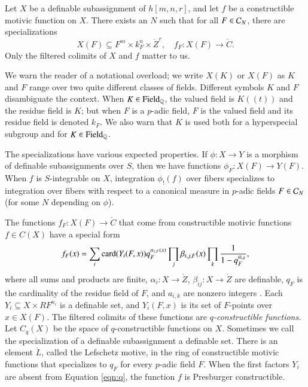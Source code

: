 Let $X$ be a definable subassignment of $h[m,n,r]$, and let $f$ be a
constructible motivic function on $X$.  There exists an $N$ such that
for all $F\in \mathcal C_N$, there are specializations
\[
X(F)\subseteq F^m\times k_F^n\times \ring{Z}^r,  
\quad f_F: X(F) \to\ring{C}.
\]
Only the  filtered colimits of $X$ and $f$ matter to us.

We warn the reader of a notational overload; we write $X(K)$ or $X(F)$
as $K$ and $F$ range over two quite different classes of fields.
Different symbols $K$ and $F$ disambiguate the context.  When $K\in
{\operatorname{Field}}_{\mathbb{Q}}$, the valued field is $K((t))$ and the residue field is
$K$; but when $F$ is a $p$-adic field, $F$ is the valued field and its
residue field is denoted $k_F$.  We also warn that $K$ is used both
for a hyperspecial subgroup and for $K\in{\operatorname{Field}}_{\mathbb{Q}}$.

The specializations have various expected properties.  If $\phi:X\to
Y$ is a morphism of definable subassignments over $S$, then we have
functions $\phi_F:X(F)\to Y(F)$.  When $f$ is $S$-integrable on $X$,
integration $\phi_!(f)$ over fibers specializes to integration over
fibers with respect to a canonical measure in $p$-adic fields $F\in
\mathcal C_N$ (for some $N$ depending on $\phi$).

The functions $f_F:X(F)\to\ring{C}$ that come from constructible
motivic functions $f\in C(X)$ have a special form
\begin{equation}\label{eqn:q}
f_F(x) = \sum_i {\operatorname{card}}(Y_i(F,x)) q_F^{\alpha_{i,F}(x)} 
\prod_j \beta_{i,j,F}(x)\prod_k \frac{1}{1-q_F^{a_{i,k}}},
\end{equation}
where all sums and products are finite, $\alpha_{i}:X\to\ring{Z}$,
$\beta_{ij}:X\to\ring{Z}$ are definable, $q_F$ is the cardinality of
the residue field of $F$, and $a_{i,k}$ are nonzero integers
\cite[\S2]{cluckers2011btransfer}.  
Each $Y_i\subseteq X\times RF^{n_i}$ is a definable set,
and $Y_i(F,x)$ is its set of $F$-points over $x\in X(F)$. 
The filtered colimits of these
functions are {\it $q$-constructible functions}.  Let $C_q(X)$ be the
space of $q$-constructible functions on $X$.  Sometimes we call the
specialization of a definable subassignment a definable set.  There is
an element $\ring{L}$, called the Lefschetz motive, in the ring of
constructible motivic functions that specializes to $q_F$ for every
$p$-adic field $F$.  When the first factors $Y_i$ are absent from
Equation \ref{eqn:q}, the function $f$ is Presburger constructible.

